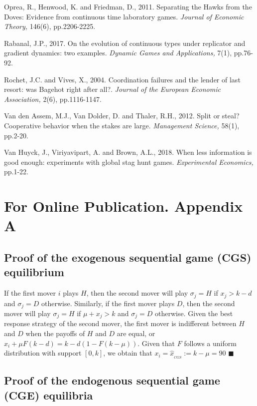 \documentclass[11pt,english]{article}
\begin{document}
\begin{thebibliography}{10}
\bibitem{} Oprea, R., Henwood, K. and Friedman, D., 2011. Separating the Hawks from the Doves: Evidence from continuous time laboratory games. \textit{Journal of Economic Theory,} 146(6), pp.2206-2225.

\bibitem{} Rabanal, J.P., 2017. On the evolution of continuous types under replicator and gradient dynamics: two examples. \textit{Dynamic Games and Applications,} 7(1), pp.76-92.

\bibitem{} Rochet, J.C. and Vives, X., 2004. Coordination failures and the lender of last resort: was Bagehot right after all?. \textit{Journal of the European Economic Association,} 2(6), pp.1116-1147.

\bibitem{} Van den Assem, M.J., Van Dolder, D. and Thaler, R.H., 2012. Split or steal? Cooperative behavior when the stakes are large. \textit{Management Science,} 58(1), pp.2-20.

\bibitem{} Van Huyck, J., Viriyavipart, A. and Brown, A.L., 2018. When less information is good enough: experiments with global stag hunt games. \textit{Experimental Economics,} pp.1-22.


\end{thebibliography}

\newpage
\section*{For Online Publication. Appendix A}

\subsection*{Proof of the exogenous sequential game (CGS) equilibrium}

If the first mover $i$ plays $H$, then the second mover will play $\sigma_j= H$ if $x_j> k-d$ and $\sigma_j= D$ otherwise. Similarly, if the first mover plays $D$, then the second mover will play $\sigma_j= H$ if $\mu+x_j> k$ and  $\sigma_j= D$ otherwise. Given the best response strategy of the second mover, the first mover is indifferent between $H$ and $D$ when the payoffs of $H$ and $D$ are equal, or $x_i + \mu F(k-d) = k - d(1-F(k-\mu))$. Given that $F$ follows a uniform distribution with support $[0,k]$, we obtain that $x_i=\hat{x}_{_{CGS}}:= k-\mu=90$ $\blacksquare$

\subsection*{Proof of the endogenous sequential game (CGE) equilibria}
\end{document}
